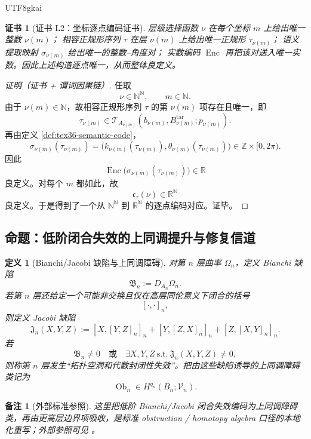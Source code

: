 \documentclass[12pt]{article}
\newtheorem{definition}{定义}[section]
\newtheorem{remark}{备注}[section]
\newtheorem{Certificate}{证书}[section]
\newcommand{\NN}{\mathbb{N}}
\newcommand{\RR}{\mathbb{R}}
\newcommand{\ZZ}{\mathbb{Z}}
\newcommand{\Enc}{\operatorname{Enc}}
\newcommand{\Ob}{\operatorname{Ob}}
\begin{document}
\begin{CJK*}{UTF8}{gkai}
\begin{Certificate}[证书 L2：坐标逐点编码证书]
\label{cert:tex36-l2}
层级选择函数 $\nu$ 在每个坐标 $m$ 上给出唯一整数 $\nu(m)$；
相容正规形序列 $\tau$ 在层 $\nu(m)$ 上给出唯一正规形 $\tau_{\nu(m)}$；
语义提取映射 $\sigma_{\nu(m)}$ 给出唯一的整数--角度对；
实数编码 $\Enc$ 再把该对送入唯一实数。因此上述构造逐点唯一，从而整体良定义。
\end{Certificate}

\begin{proof}[证明（证书 + 谓词因果链）]
任取
\[
  \nu\in \NN^\NN,\qquad m\in \NN.
\]
由于 $\nu(m)\in\NN$，故相容正规形序列 $\tau$ 的第 $\nu(m)$ 项存在且唯一，即
\[
  \tau_{\nu(m)}\in \mathcal{T}_{A_{\nu(m)}}(b_{\nu(m)},B_{\nu(m)}^{\mathrm{tar}};p_{\nu(m)}).
\]
再由定义 \ref{def:tex36-semantic-code}，
\[
  \sigma_{\nu(m)}(\tau_{\nu(m)})
  =
  \bigl(k_{\nu(m)}(\tau_{\nu(m)}),\theta_{\nu(m)}(\tau_{\nu(m)})\bigr)
  \in \ZZ\times [0,2\pi).
\]
因此
\[
  \Enc\bigl(\sigma_{\nu(m)}(\tau_{\nu(m)})\bigr)\in \RR
\]
良定义。对每个 $m$ 都如此，故
\[
  \mathfrak c_{\tau}(\nu)
  \in \RR^\NN
\]
良定义。于是得到了一个从 $\NN^\NN$ 到 $\RR^\NN$ 的逐点编码对应。证毕。
\end{proof}

\subsection{命题：低阶闭合失效的上同调提升与修复信道}
\label{subsec:tex36-obstruction}

\begin{definition}[Bianchi/Jacobi 缺陷与上同调障碍]
\label{def:tex36-obstruction}
对第 $n$ 层曲率 $\Omega_n$，定义 Bianchi 缺陷
\[
  \mathfrak B_n:=D_{A_n}\Omega_n.
\]
若第 $n$ 层还给定一个可能非交换且仅在高层同伦意义下闭合的括号
\[
  [\cdot,\cdot]_n,
\]
则定义 Jacobi 缺陷
\[
  \mathfrak J_n(X,Y,Z)
  :=
  [X,[Y,Z]_n]_n+[Y,[Z,X]_n]_n+[Z,[X,Y]_n]_n.
\]
若
\[
  \mathfrak B_n\neq 0
  \quad\text{或}\quad
  \exists X,Y,Z\ \text{s.t.}\ \mathfrak J_n(X,Y,Z)\neq 0,
\]
则称第 $n$ 层发生“拓扑空洞和代数封闭性失效”。把由这些缺陷诱导的上同调障碍类记为
\[
  \Ob_n\in H^{q_n}(B_n;\mathcal V_n).
\]
\end{definition}

\begin{remark}[外部标准参照]
这里把低阶 Bianchi/Jacobi 闭合失效编码为上同调障碍类，再由更高层边界项吸收，是标准 obstruction / homotopy algebra 口径的本地化重写；外部参照可见
  \cite{Whitehead1978Elements,Weibel1994HomologicalAlgebra,LodayVallette2012AlgebraicOperads}。
\end{remark}


\end{CJK*}
\end{document}
